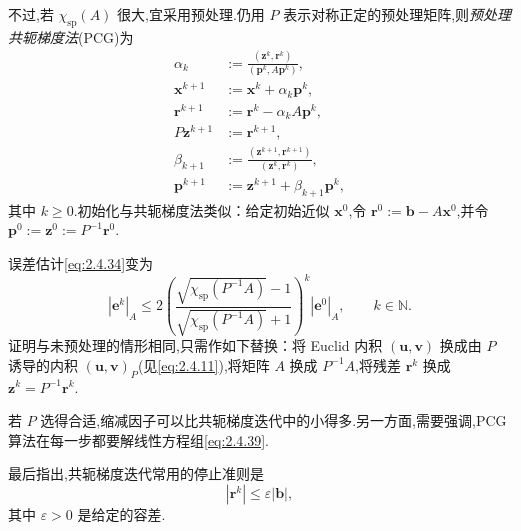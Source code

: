 不过,若 \(\chi_{\mathrm{sp}}(A)\) 很大,宜采用预处理.仍用 \(P\) 表示对称正定的预处理矩阵,则\emph{预处理共轭梯度法}(PCG)为
\begin{align}
  \alpha_k&:=\frac{(\boldsymbol{z}^k,\boldsymbol{r}^k)}{(\boldsymbol{p}^k,A\boldsymbol{p}^k)},\label{eq:2.4.36}\\
  \boldsymbol{x}^{k+1}&:=\boldsymbol{x}^k+\alpha_k\boldsymbol{p}^k,\label{eq:2.4.37}\\
  \boldsymbol{r}^{k+1}&:=\boldsymbol{r}^k-\alpha_k A\boldsymbol{p}^k,\label{eq:2.4.38}\\
  P\boldsymbol{z}^{k+1}&:=\boldsymbol{r}^{k+1},\label{eq:2.4.39}\\
  \beta_{k+1}&:=\frac{(\boldsymbol{z}^{k+1},\boldsymbol{r}^{k+1})}{(\boldsymbol{z}^k,\boldsymbol{r}^k)},\label{eq:2.4.40}\\
  \boldsymbol{p}^{k+1}&:=\boldsymbol{z}^{k+1}+\beta_{k+1}\boldsymbol{p}^k,\label{eq:2.4.41}
\end{align}
其中 \(k\ge0\).初始化与共轭梯度法类似：给定初始近似 \(\boldsymbol{x}^0\),令 \(\boldsymbol{r}^0:=\boldsymbol{b}-A\boldsymbol{x}^0\),并令 \(\boldsymbol{p}^0:=\boldsymbol{z}^0:=P^{-1}\boldsymbol{r}^0\).

误差估计\eqref{eq:2.4.34}变为
\begin{equation}\label{eq:2.4.42}
  |\boldsymbol{e}^k|_A\le
  2\left(\frac{\sqrt{\chi_{\mathrm{sp}}(P^{-1}A)}-1}
               {\sqrt{\chi_{\mathrm{sp}}(P^{-1}A)}+1}\right)^k|\boldsymbol{e}^0|_A,
  \qquad k\in\mathbb N.
\end{equation}
证明与未预处理的情形相同,只需作如下替换：将 Euclid 内积 \((\boldsymbol{u},\boldsymbol{v})\) 换成由 \(P\) 诱导的内积 \((\boldsymbol{u},\boldsymbol{v})_P\)(见\eqref{eq:2.4.11}),将矩阵 \(A\) 换成 \(P^{-1}A\),将残差 \(\boldsymbol{r}^k\) 换成 \(\boldsymbol{z}^k=P^{-1}\boldsymbol{r}^k\).

若 \(P\) 选得合适,缩减因子可以比共轭梯度迭代中的小得多.另一方面,需要强调,PCG 算法在每一步都要解线性方程组\eqref{eq:2.4.39}.

最后指出,共轭梯度迭代常用的停止准则是
\begin{equation}\label{eq:2.4.43}
  |\boldsymbol{r}^k|\le\varepsilon|\boldsymbol{b}|,
\end{equation}
其中 \(\varepsilon>0\) 是给定的容差.

